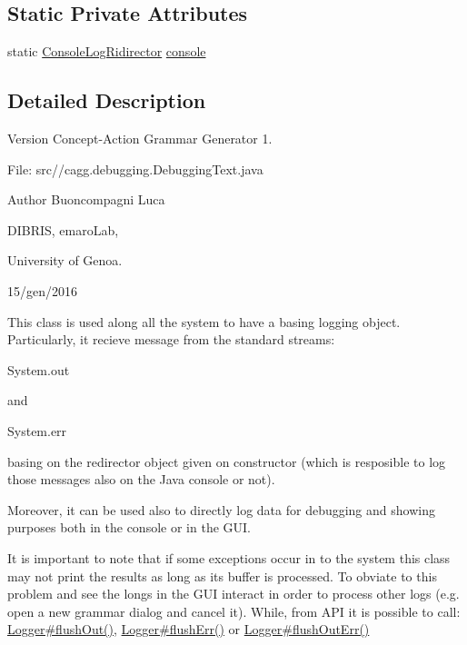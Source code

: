 \subsection*{Static Private Attributes}
\begin{DoxyCompactItemize}
\item 
static \hyperlink{classit_1_1emarolab_1_1cagg_1_1debugging_1_1StandaloneDebuggingText_1_1ConsoleLogRidirector}{Console\-Log\-Ridirector} \hyperlink{classit_1_1emarolab_1_1cagg_1_1debugging_1_1StandaloneDebuggingText_1_1Logger_a3be4cb583ba0e232fd954cb01c0620e3}{console}
\end{DoxyCompactItemize}


\subsection{Detailed Description}
\begin{DoxyVersion}{Version}
Concept-\/\-Action Grammar Generator 1. \par
 File\-: src//cagg.debugging.\-Debugging\-Text.\-java \par

\end{DoxyVersion}
\begin{DoxyAuthor}{Author}
Buoncompagni Luca \par
 D\-I\-B\-R\-I\-S, emaro\-Lab,\par
 University of Genoa. \par
 15/gen/2016 \par

\end{DoxyAuthor}


This class is used along all the system to have a basing logging object. Particularly, it recieve message from the standard streams\-:
\begin{DoxyCode}
System.out 
\end{DoxyCode}
 and
\begin{DoxyCode}
System.err 
\end{DoxyCode}
 basing on the redirector object given on constructor (which is resposible to log those messages also on the Java console or not).\par
 Moreover, it can be used also to directly log data for debugging and showing purposes both in the console or in the G\-U\-I.\par
 It is important to note that if some exceptions occur in to the system this class may not print the results as long as its buffer is processed. To obviate to this problem and see the longs in the G\-U\-I interact in order to process other logs (e.\-g. open a new grammar dialog and cancel it). While, from A\-P\-I it is possible to call\-: \hyperlink{classit_1_1emarolab_1_1cagg_1_1debugging_1_1StandaloneDebuggingText_1_1Logger_a183a06eb65bc84345773a5f75c977021}{Logger\#flush\-Out()}, \hyperlink{classit_1_1emarolab_1_1cagg_1_1debugging_1_1StandaloneDebuggingText_1_1Logger_aaa508dcaa92c2b63e0e6ac31bc23ddff}{Logger\#flush\-Err()} or \hyperlink{classit_1_1emarolab_1_1cagg_1_1debugging_1_1StandaloneDebuggingText_1_1Logger_a3834949691767f27ea4913df27751b10}{Logger\#flush\-Out\-Err()} 

